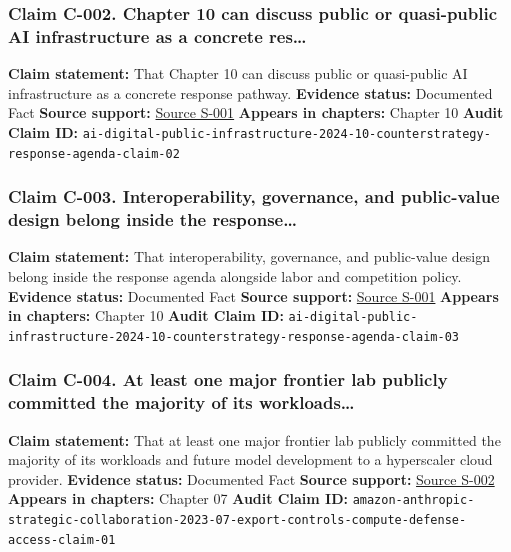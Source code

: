 \documentclass[
  american,
  11pt,
  letterpaper,
]{article}
\begin{document}
\subsubsection{Claim C-002. Chapter 10 can discuss public or
quasi-public AI infrastructure as a concrete
res\ldots{}}\label{claim-c-002-chapter-10-can-discuss-public-or-quasi-public-ai-infrastructure-as-a-concrete-res}

\textbf{Claim statement:} That Chapter 10 can discuss public or
quasi-public AI infrastructure as a concrete response pathway.
\textbf{Evidence status:} Documented Fact \textbf{Source support:}
\hyperref[source-s-001-interactions-between-artificial-intelligence-and-digital-public-infrastructure-concepts-benefits-and-challenges]{Source
S-001} \textbf{Appears in chapters:} Chapter 10 \textbf{Audit Claim ID:}
\texttt{ai-digital-public-infrastructure-2024-10-counterstrategy-response-agenda-claim-02}

\subsubsection{Claim C-003. Interoperability, governance, and
public-value design belong inside the
response\ldots{}}\label{claim-c-003-interoperability-governance-and-public-value-design-belong-inside-the-response}

\textbf{Claim statement:} That interoperability, governance, and
public-value design belong inside the response agenda alongside labor
and competition policy. \textbf{Evidence status:} Documented Fact
\textbf{Source support:}
\hyperref[source-s-001-interactions-between-artificial-intelligence-and-digital-public-infrastructure-concepts-benefits-and-challenges]{Source
S-001} \textbf{Appears in chapters:} Chapter 10 \textbf{Audit Claim ID:}
\texttt{ai-digital-public-infrastructure-2024-10-counterstrategy-response-agenda-claim-03}

\subsubsection{Claim C-004. At least one major frontier lab publicly
committed the majority of its
workloads\ldots{}}\label{claim-c-004-at-least-one-major-frontier-lab-publicly-committed-the-majority-of-its-workloads}

\textbf{Claim statement:} That at least one major frontier lab publicly
committed the majority of its workloads and future model development to
a hyperscaler cloud provider. \textbf{Evidence status:} Documented Fact
\textbf{Source support:}
\hyperref[source-s-002-amazon-and-anthropic-announce-strategic-collaboration-to-advance-generative-ai]{Source
S-002} \textbf{Appears in chapters:} Chapter 07 \textbf{Audit Claim ID:}
\texttt{amazon-anthropic-strategic-collaboration-2023-07-export-controls-compute-defense-access-claim-01}
\end{document}
